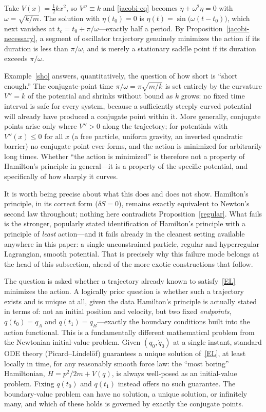 \begin{example}
\label{sho}
Take $V(x)=\tfrac12 kx^2$, so $V''\equiv k$ and \eqref{jacobi-eq} becomes
    $\ddot\eta+\omega^2\eta=0$ with $\omega=\sqrt{k/m}$. The solution with
    $\eta(t_0)=0$ is $\eta(t)=\sin\!\big(\omega(t-t_0)\big)$, which next
    vanishes at $t_c=t_0+\pi/\omega$---exactly half a period. By
    Proposition~\ref{jacobi-necessary}, a segment of oscillator trajectory
    genuinely minimizes the action if its duration is less than $\pi/\omega$,
    and is merely a stationary saddle point if its duration exceeds
    $\pi/\omega$.
\end{example}

Example~\ref{sho} answers, quantitatively, the question of how short is ``short
enough.'' The conjugate-point time $\pi/\omega=\pi\sqrt{m/k}$ is set entirely
by the curvature $V''=k$ of the potential and shrinks without bound as $k$
grows: no fixed time interval is safe for every system, because a sufficiently
steeply curved potential will already have produced a conjugate point within
it. More generally, conjugate points arise only where $V''>0$ along the
trajectory; for potentials with $V''(x)\leq 0$ for all $x$ (a free particle,
uniform gravity, an inverted quadratic barrier) no conjugate point ever forms,
and the action is minimized for arbitrarily long times.
Whether ``the action is minimized'' is therefore not a property of Hamilton's
principle in general---it is a property of the specific potential, and
specifically of how sharply it curves.

It is worth being precise about what this does and does not show. Hamilton's
principle, in its correct form ($\delta S=0$), remains exactly equivalent to
Newton's second law throughout; nothing here contradicts
Proposition~\ref{regular}. What fails is the stronger, popularly stated
identification of Hamilton's principle with a principle of \emph{least}
action---and it fails already in the cleanest setting available anywhere in
this paper: a single unconstrained particle, regular and hyperregular
Lagrangian, smooth potential. That is precisely why this failure mode belongs
at the head of this subsection, ahead of the more exotic constructions that
follow.

The question is asked whether a trajectory already known to
satisfy~\eqref{EL} minimizes the action. A logically prior question is whether
such a trajectory exists and is unique at all, given the data Hamilton's
principle is actually stated in terms of: not an initial position and velocity,
but two fixed \emph{endpoints}, $q(t_0)=q_A$ and $q(t_1)=q_B$---exactly the
boundary conditions built into the action functional. 
This is a fundamentally different mathematical
problem from the Newtonian initial-value problem. Given $(q_0,\dot q_0)$ at a
single instant, standard ODE theory (Picard--Lindelöf) guarantees a unique
solution of~\eqref{EL}, at least locally in time, for any reasonably smooth
force law: the ``most boring'' Hamiltonian, $H=p^2/2m+V(q)$, is always
well-posed as an initial-value problem. Fixing $q(t_0)$ and $q(t_1)$ instead
offers no such guarantee. The boundary-value problem can have no solution, a
unique solution, or infinitely many, and which of these holds is governed by
exactly the conjugate points.

